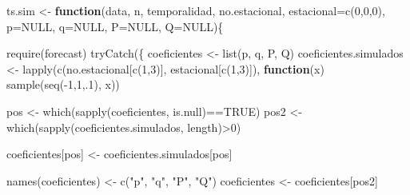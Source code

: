 \documentclass[
]{article}
\newenvironment{Shaded}{\begin{snugshade}}{\end{snugshade}}
\newcommand{\AttributeTok}[1]{\textcolor[rgb]{0.77,0.63,0.00}{#1}}
\newcommand{\ConstantTok}[1]{\textcolor[rgb]{0.00,0.00,0.00}{#1}}
\newcommand{\ControlFlowTok}[1]{\textcolor[rgb]{0.13,0.29,0.53}{\textbf{#1}}}
\newcommand{\DecValTok}[1]{\textcolor[rgb]{0.00,0.00,0.81}{#1}}
\newcommand{\FunctionTok}[1]{\textcolor[rgb]{0.00,0.00,0.00}{#1}}
\newcommand{\NormalTok}[1]{#1}
\newcommand{\OtherTok}[1]{\textcolor[rgb]{0.56,0.35,0.01}{#1}}
\newcommand{\SpecialCharTok}[1]{\textcolor[rgb]{0.00,0.00,0.00}{#1}}
\newcommand{\StringTok}[1]{\textcolor[rgb]{0.31,0.60,0.02}{#1}}
\begin{document}
\begin{Shaded}
\begin{Highlighting}[]
\NormalTok{ts.sim }\OtherTok{\textless{}{-}} \ControlFlowTok{function}\NormalTok{(data, n, temporalidad, }
\NormalTok{                            no.estacional, }\AttributeTok{estacional=}\FunctionTok{c}\NormalTok{(}\DecValTok{0}\NormalTok{,}\DecValTok{0}\NormalTok{,}\DecValTok{0}\NormalTok{), }
                            \AttributeTok{p=}\ConstantTok{NULL}\NormalTok{, }\AttributeTok{q=}\ConstantTok{NULL}\NormalTok{, }\AttributeTok{P=}\ConstantTok{NULL}\NormalTok{, }\AttributeTok{Q=}\ConstantTok{NULL}\NormalTok{)\{}
  
  \FunctionTok{require}\NormalTok{(forecast)}
  \FunctionTok{tryCatch}\NormalTok{(\{}
\NormalTok{      coeficientes }\OtherTok{\textless{}{-}} \FunctionTok{list}\NormalTok{(p, q, P, Q)}
\NormalTok{      coeficientes.simulados }\OtherTok{\textless{}{-}} \FunctionTok{lapply}\NormalTok{(}\FunctionTok{c}\NormalTok{(no.estacional[}\FunctionTok{c}\NormalTok{(}\DecValTok{1}\NormalTok{,}\DecValTok{3}\NormalTok{)], }
\NormalTok{                                         estacional[}\FunctionTok{c}\NormalTok{(}\DecValTok{1}\NormalTok{,}\DecValTok{3}\NormalTok{)]), }
                                       \ControlFlowTok{function}\NormalTok{(x) }\FunctionTok{sample}\NormalTok{(}\FunctionTok{seq}\NormalTok{(}\SpecialCharTok{{-}}\DecValTok{1}\NormalTok{,}\DecValTok{1}\NormalTok{,.}\DecValTok{1}\NormalTok{), x))}
      
\NormalTok{    pos }\OtherTok{\textless{}{-}} \FunctionTok{which}\NormalTok{(}\FunctionTok{sapply}\NormalTok{(coeficientes, is.null)}\SpecialCharTok{==}\ConstantTok{TRUE}\NormalTok{)}
\NormalTok{    pos2 }\OtherTok{\textless{}{-}} \FunctionTok{which}\NormalTok{(}\FunctionTok{sapply}\NormalTok{(coeficientes.simulados, length)}\SpecialCharTok{\textgreater{}}\DecValTok{0}\NormalTok{)}
    
\NormalTok{    coeficientes[pos] }\OtherTok{\textless{}{-}}\NormalTok{ coeficientes.simulados[pos]}
    
    \FunctionTok{names}\NormalTok{(coeficientes) }\OtherTok{\textless{}{-}} \FunctionTok{c}\NormalTok{(}\StringTok{"p"}\NormalTok{, }\StringTok{"q"}\NormalTok{, }\StringTok{"P"}\NormalTok{, }\StringTok{"Q"}\NormalTok{)}
\NormalTok{    coeficientes }\OtherTok{\textless{}{-}}\NormalTok{ coeficientes[pos2]}
    

\end{Highlighting}
\end{Shaded}
\end{document}
